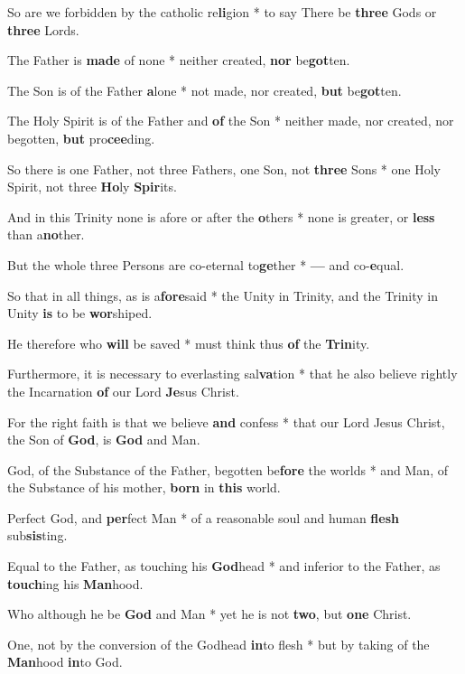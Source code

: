 \begin{multicols}{2}
	So are we forbidden by the catholic re\textbf{li}gion * to say There be \textbf{three} Gods or \textbf{three} Lords. 
	
	The Father is \textbf{made} of none * neither created, \textbf{nor} be\textbf{got}ten.
	
	The Son is of the Father \textbf{a}lone * not made, nor created, \textbf{but} be\textbf{got}ten.
	
	The Holy Spirit is of the Father and \textbf{of} the Son * neither made, nor created, nor begotten, \textbf{but} pro\textbf{cee}ding.
	
	So there is one Father, not three Fathers, one Son, not \textbf{three} Sons * one Holy Spirit, not three \textbf{Ho}ly \textbf{Spir}its.
	
	And in this Trinity none is afore or after the \textbf{o}thers * none is greater, or \textbf{less} than a\textbf{no}ther.
	
	But the whole three Persons are co-eternal to\textbf{ge}ther * \textbf{---} and co-\textbf{e}qual.
	
	So that in all things, as is a\textbf{fore}said * the Unity in Trinity, and the Trinity in Unity \textbf{is} to be \textbf{wor}shiped.
	
	He therefore who \textbf{will} be saved * must think thus \textbf{of} the \textbf{Trin}ity.
	
	Furthermore, it is necessary to everlasting sal\textbf{va}tion * that he also believe rightly the Incarnation \textbf{of} our Lord \textbf{Je}sus Christ.
	
	For the right faith is that we believe \textbf{and} confess * that our Lord Jesus Christ, the Son of \textbf{God}, is \textbf{God} and Man.
	
	God, of the Substance of the Father, begotten be\textbf{fore} the worlds * and Man, of the Substance of his mother, \textbf{born} in \textbf{this} world.
	
	Perfect God, and \textbf{per}fect Man * of a reasonable soul and human \textbf{flesh} sub\textbf{sis}ting.
	
	Equal to the Father, as touching his \textbf{God}head * and inferior to the Father, as \textbf{touch}ing his \textbf{Man}hood.
	
	Who although he be \textbf{God} and Man * yet he is not \textbf{two}, but \textbf{one} Christ.
	
	One, not by the conversion of the Godhead \textbf{in}to flesh * but by taking of the \textbf{Man}hood \textbf{in}to God.
	

\end{multicols}
